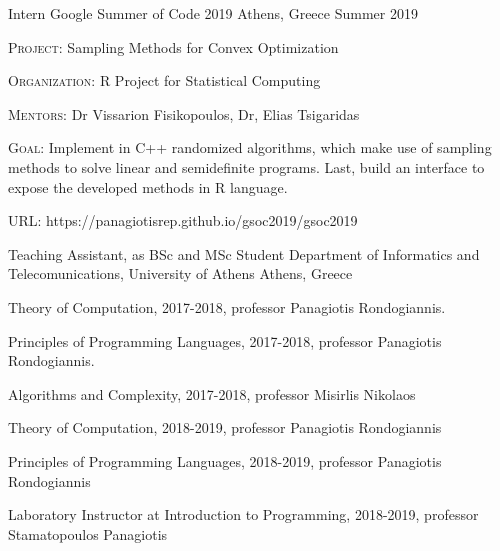 

\begin{cventries}



  \cventry
    {Intern} %
    {Google Summer of Code 2019} %
    {Athens, Greece} %
    {Summer 2019} %
    {
      \begin{cvitems} %
        \item {{\fontsize{8pt}{1em}\bodyfont\scshape Project}: Sampling Methods for Convex Optimization}
        \item {{\fontsize{8pt}{1em}\bodyfont\scshape Organization}: R Project for Statistical Computing}
        \item {{\fontsize{8pt}{1em}\bodyfont\scshape Mentors}: Dr Vissarion Fisikopoulos, Dr, Elias Tsigaridas}
        \item {{\fontsize{8pt}{1em}\bodyfont\scshape Goal}: Implement in C++ randomized algorithms, which make use of sampling methods to solve linear and semidefinite programs. Last, build an interface to expose the developed methods in R language.}
        \item {{\fontsize{8pt}{1em}\bodyfont\scshape URL}: https://panagiotisrep.github.io/gsoc2019/gsoc2019}
      \end{cvitems}
    }

  \cventry
    {Teaching Assistant, as BSc and MSc Student} %
    {Department of Informatics and Telecomunications, University of Athens} %
    {Athens, Greece} %
    {} %
    {
      \begin{cvitems} %
        \item {Theory of Computation, 2017-2018, professor Panagiotis Rondogiannis.}
        \item {Principles of Programming Languages, 2017-2018, professor Panagiotis Rondogiannis.}
        \item {Algorithms and Complexity, 2017-2018, professor Misirlis Nikolaos      }
        \item {Theory of Computation, 2018-2019, professor Panagiotis Rondogiannis
        }
        \item {Principles of Programming Languages, 2018-2019, professor Panagiotis Rondogiannis
        }
	    \item {Laboratory Instructor at Introduction to Programming, 2018-2019, professor Stamatopoulos Panagiotis
	    }
      \end{cvitems}
    }


\end{cventries}
